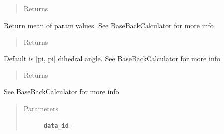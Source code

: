 \documentclass[letterpaper,10pt,english]{sphinxmanual}
\begin{document}
\begin{fulllineitems}
\begin{fulllineitems}
\begin{quote}
\begin{description}
\item[{Returns}] \leavevmode


\end{description}\end{quote}

\end{fulllineitems}


\begin{fulllineitems}
\label{modules:backcalc.JCoupBackCalc.get_default_params}
Return mean of param values. See BaseBackCalculator for more info
\begin{quote}\begin{description}
\item[{Returns}] \leavevmode


\end{description}\end{quote}

\end{fulllineitems}


\begin{fulllineitems}
\label{modules:backcalc.JCoupBackCalc.get_default_struct_val}
Default is {[}pi, pi{]} dihedral angle. See BaseBackCalculator for more info
\begin{quote}\begin{description}
\item[{Returns}] \leavevmode


\end{description}\end{quote}

\end{fulllineitems}


\begin{fulllineitems}
\label{modules:backcalc.JCoupBackCalc.get_err_sig}
See BaseBackCalculator for more info
\begin{quote}\begin{description}
\item[{Parameters}] \leavevmode
\textbf{\texttt{data\_id}} -- 


\end{description}
\end{quote}
\end{fulllineitems}
\end{fulllineitems}
\end{document}
